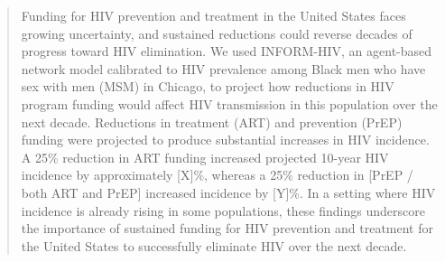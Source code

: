 \documentclass[preprint,12pt]{elsarticle}
\begin{document}
\begin{frontmatter}
\author[CAUSAL]{Raffaele Vardavas} %

\author[RANDVA]{Kara Jia} %

\author[UCHICAGO, ARGONNE]{Jonathan Ozik} %





\begin{abstract}
Funding for HIV prevention and treatment in the United States faces growing uncertainty, and sustained reductions could reverse decades of progress toward HIV elimination. We used INFORM-HIV, an agent-based network model calibrated to HIV prevalence among Black men who have sex with men (MSM) in Chicago, to project how reductions in HIV program funding would affect HIV transmission in this population over the next decade. Reductions in treatment (ART) and prevention (PrEP) funding were projected to produce substantial increases in HIV incidence. A 25\% reduction in ART funding increased projected 10-year HIV incidence by approximately [X]\%, whereas a 25\% reduction in [PrEP / both ART and PrEP] increased incidence by [Y]\%. In a setting where HIV incidence is already rising in some populations, these findings underscore the importance of sustained funding for HIV prevention and treatment for the United States to successfully eliminate HIV over the next decade.
\end{abstract}



\end{frontmatter}
\end{document}
